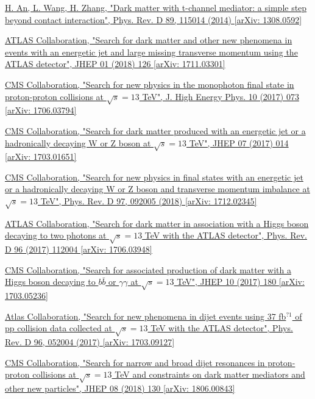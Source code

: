 \documentclass[a4paper, 10pt, openright]{report}
\begin{document}
\begin{thebibliography}{1}
\href{https://arxiv.org/abs/1308.0592}{H. An, L. Wang, H. Zhang,
"Dark matter with t-channel mediator: a simple step beyond contact interaction",
Phys. Rev. D 89, 115014 (2014) [arXiv: 1308.0592]
}

\href{https://arxiv.org/abs/1711.03301}{ATLAS Collaboration,
"Search for dark matter and other new phenomena in events with an energetic jet and large missing transverse momentum using the ATLAS detector",
JHEP 01 (2018) 126 [arXiv: 1711.03301]
}

\href{https://arxiv.org/abs/1706.03794}{CMS Collaboration,
"Search for new physics in the monophoton final state in proton-proton collisions at $\sqrt{s} = 13$ TeV",
J. High Energy Phys. 10 (2017) 073 [arXiv: 1706.03794]
}

\href{https://arxiv.org/abs/1703.01651}{CMS Collaboration,
"Search for dark matter produced with an energetic jet or a hadronically decaying W or Z boson at $\sqrt{s} = 13$ TeV",
JHEP 07 (2017) 014 [arXiv: 1703.01651]
}

\href{https://arxiv.org/abs/1712.02345}{CMS Collaboration,
"Search for new physics in final states with an energetic jet or a hadronically decaying W or Z boson and transverse momentum imbalance at $\sqrt{s} = 13$ TeV",
Phys. Rev. D 97, 092005 (2018) [arXiv: 1712.02345]
}

\href{https://arxiv.org/abs/1706.03948}{ATLAS Collaboration,
"Search for dark matter in association with a Higgs boson decaying to two photons at $\sqrt{s} = 13$ TeV with the ATLAS detector",
Phys. Rev. D 96 (2017) 112004 [arXiv: 1706.03948]
}

\href{https://arxiv.org/abs/1703.05236}{CMS Collaboration,
"Search for associated production of dark matter with a Higgs boson decaying to $b \bar b$ or $\gamma \gamma$ at $\sqrt{s} = 13$ TeV",
JHEP 10 (2017) 180 [arXiv: 1703.05236]
}

\href{https://arxiv.org/abs/1703.09127}{Atlas Collaboration,
"Search for new phenomena in dijet events using 37 fb$^{?1}$ of pp collision data collected at $\sqrt{s} = 13$ TeV with the ATLAS detector",
Phys. Rev. D 96, 052004 (2017) [arXiv: 1703.09127]
}

\href{https://arxiv.org/abs/1806.00843}{CMS Collaboration,
"Search for narrow and broad dijet resonances in proton-proton collisions at $\sqrt{s} = 13$ TeV and constraints on dark matter mediators and other new particles",
JHEP 08 (2018) 130 [arXiv: 1806.00843]
}


\end{thebibliography}
\end{document}
